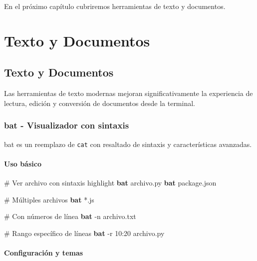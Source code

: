 \documentclass[
  11pt,
  letterpaper,
  oneside,
  openany]{scrbook}
\newenvironment{Shaded}{}{}
\newcommand{\AttributeTok}[1]{\textcolor[rgb]{0.84,0.23,0.29}{#1}}
\newcommand{\CommentTok}[1]{\textcolor[rgb]{0.42,0.45,0.49}{#1}}
\newcommand{\ExtensionTok}[1]{\textcolor[rgb]{0.84,0.23,0.29}{\textbf{#1}}}
\newcommand{\NormalTok}[1]{\textcolor[rgb]{0.14,0.16,0.18}{#1}}
\newcommand{\PreprocessorTok}[1]{\textcolor[rgb]{0.84,0.23,0.29}{#1}}
\begin{document}
En el próximo capítulo cubriremos herramientas de texto y documentos.

\part{Texto y Documentos}

\chapter{Texto y Documentos}\label{texto-y-documentos-3}

Las herramientas de texto modernas mejoran significativamente la
experiencia de lectura, edición y conversión de documentos desde la
terminal.

\section{bat - Visualizador con sintaxis}\label{sec-bat}

bat es un reemplazo de \texttt{cat} con resaltado de sintaxis y
características avanzadas.

\subsection{Uso básico}\label{uso-buxe1sico-5}

\begin{Shaded}
\begin{Highlighting}[]
\CommentTok{\# Ver archivo con sintaxis highlight}
\ExtensionTok{bat}\NormalTok{ archivo.py}
\ExtensionTok{bat}\NormalTok{ package.json}

\CommentTok{\# Múltiples archivos}
\ExtensionTok{bat} \PreprocessorTok{*}\NormalTok{.js}

\CommentTok{\# Con números de línea}
\ExtensionTok{bat} \AttributeTok{{-}n}\NormalTok{ archivo.txt}

\CommentTok{\# Rango específico de líneas}
\ExtensionTok{bat} \AttributeTok{{-}r}\NormalTok{ 10:20 archivo.py}
\end{Highlighting}
\end{Shaded}

\subsection{Configuración y temas}\label{configuraciuxf3n-y-temas}
\end{document}
